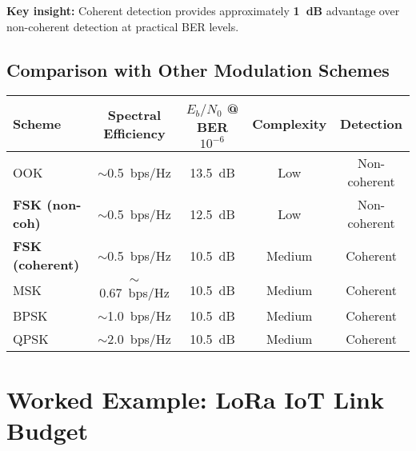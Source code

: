 \textbf{Key insight:} Coherent detection provides approximately \textbf{1~dB} advantage over non-coherent detection at practical BER levels.

\subsection{Comparison with Other Modulation Schemes}

\begin{center}
\begin{tabular}{@{}lcccc@{}}
\toprule
\textbf{Scheme} & \textbf{Spectral Efficiency} & \textbf{$E_b/N_0$ @ BER $10^{-6}$} & \textbf{Complexity} & \textbf{Detection} \\
\midrule
OOK & $\sim$0.5~bps/Hz & 13.5~dB & Low & Non-coherent \\
\textbf{FSK (non-coh)} & $\sim$0.5~bps/Hz & 12.5~dB & Low & Non-coherent \\
\textbf{FSK (coherent)} & $\sim$0.5~bps/Hz & 10.5~dB & Medium & Coherent \\
MSK & $\sim$0.67~bps/Hz & 10.5~dB & Medium & Coherent \\
BPSK & $\sim$1.0~bps/Hz & 10.5~dB & Medium & Coherent \\
QPSK & $\sim$2.0~bps/Hz & 10.5~dB & Medium & Coherent \\
\bottomrule
\end{tabular}
\end{center}

\section{Worked Example: LoRa IoT Link Budget}


